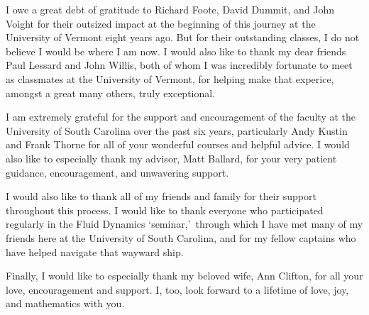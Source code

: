 I owe a great debt of gratitude to Richard Foote, David Dummit, and John Voight for their outsized impact at the beginning of this journey at the University of Vermont eight years ago.
But for their outstanding classes, I do not believe I would be where I am now.
I would also like to thank my dear friends Paul Lessard and John Willis, both of whom I was incredibly fortunate to meet as classmates at the University of Vermont, for helping make that experice, amongst a great many others, truly exceptional.

I am extremely grateful for the support and encouragement of the faculty at the University of South Carolina over the past six years, particularly Andy Kustin and Frank Thorne for all of your wonderful courses and helpful advice.
I would also like to especially thank my advisor, Matt Ballard, for your very patient guidance, encouragement, and unwavering support.

I would also like to thank all of my friends and family for their support throughout this process.
I would like to thank everyone who participated regularly in the Fluid Dynamics \lq seminar,\rq\, through which I have met many of my friends here at the University of South Carolina, and for my fellow captains who have helped navigate that wayward ship.

Finally, I would like to especially thank my beloved wife, Ann Clifton, for all your love, encouragement and support.
I, too, look forward to a lifetime of love, joy, and mathematics with you.
